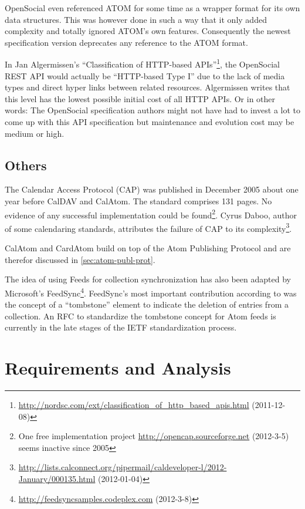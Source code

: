 \documentclass[12pt,a4paper,twoside]{scrartcl}		%
\newcommand{\citeurl}[2]{\url{#1} (#2)}
\begin{document}
OpenSocial even referenced ATOM for some time as a wrapper format for its own
data structures. This was however done in such a way that it only added
complexity and totally ignored ATOM's own
features\cite{dehora2009}. Consequently the newest specification version
deprecates any reference to the ATOM format.

In Jan Algermissen's ``Classification of HTTP-based
APIs''\footnote{\citeurl{http://nordsc.com/ext/classification_of_http_based_apis.html}{2011-12-08}},
the OpenSocial REST API would actually be ``HTTP-based Type I'' due to the lack
of media types and direct hyper links between related resources. Algermissen
writes that this level has the lowest possible initial cost of all HTTP APIs. Or
in other words: The OpenSocial specification authors might not have had to
invest a lot to come up with this API specification but maintenance and
evolution cost may be medium or high.

\subsection{Others}

The Calendar Access Protocol (CAP)\cite{RFC4324} was published in December 2005
about one year before CalDAV and CalAtom. The standard comprises 131 pages. No
evidence of any successful implementation could be found\footnote{One free
  implementation project \citeurl{http://opencap.sourceforge.net}{2012-3-5}
  seems inactive since 2005}. Cyrus Daboo, author of some calendaring standards,
attributes the failure of CAP to its
complexity\footnote{\citeurl{http://lists.calconnect.org/pipermail/caldeveloper-l/2012-January/000135.html}{2012-01-04}}.

CalAtom and CardAtom build on top of the Atom Publishing Protocol and are
therefor discussed in \autoref{sec:atom-publ-prot}.

The idea of using Feeds for collection synchronization has also been adapted by
Microsoft's
FeedSync\footnote{\citeurl{http://feedsyncsamples.codeplex.com}{2012-3-8}}. FeedSync's
most important contribution according to \cite{Snell2007} was the concept of a
``tombstone'' element to indicate the deletion of entries from a collection. An
RFC to standardize the tombstone concept\cite{draft-snell-atompub-tombstones-14}
for Atom feeds is currently in the late stages of the IETF standardization
process.

\section{Requirements and Analysis}
\label{sec:requ-analys}
\end{document}
